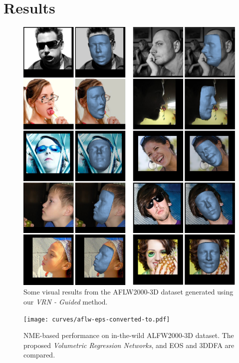 

\section{Results} \label{S:Results}

\begin{figure}
\centering
\includegraphics[width=\linewidth]{img/aflw2000res.pdf}
\caption[Visual results on AFLW2000-3D dataset]{Some visual results
  from the AFLW2000-3D dataset generated using our \textit{VRN -
    Guided} method.}
\label{fig:aflw2000res}
\vspace{-4mm}
\end{figure}

\begin{figure}
  \centering
  \texttt{[image: curves/aflw-eps-converted-to.pdf]}
  \caption[NME performance on AFLW2000-3D images]{NME-based
    performance on in-the-wild ALFW2000-3D dataset. The proposed
    \textit{Volumetric Regression Networks}, and EOS and 3DDFA are
    compared.}
  \label{roc:aflw2000}
\end{figure}


